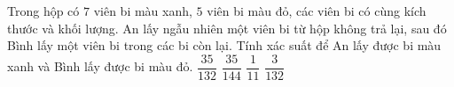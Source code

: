 \begin{ex}%
	Trong hộp có $7$ viên bi màu xanh, $5$ viên bi màu đỏ, các viên bi có cùng kích thước và khối lượng. An lấy ngẫu nhiên một viên bi từ hộp không trả lại, sau đó Bình lấy một viên bi trong các bi còn lại. Tính xác suất để An lấy được bi màu xanh và Bình lấy được bi màu đỏ.
	\choice
	{\True $\dfrac{35}{132}$}
	{$\dfrac{35}{144}$}
	{$\dfrac{1}{11}$}
	{$\dfrac{3}{132}$}
\end{ex}
